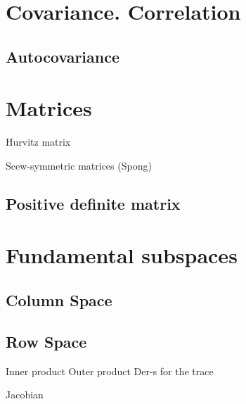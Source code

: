 \section*{Covariance. Correlation}
\subsection{Autocovariance}

\section{Matrices}

Hurvitz matrix

Scew-symmetric matrices (Spong)

\subsection{Positive definite matrix}

\section{Fundamental subspaces}
\subsection{Column Space}
\subsection{Row Space}

Inner product
Outer product
Der-s for the trace



Jacobian